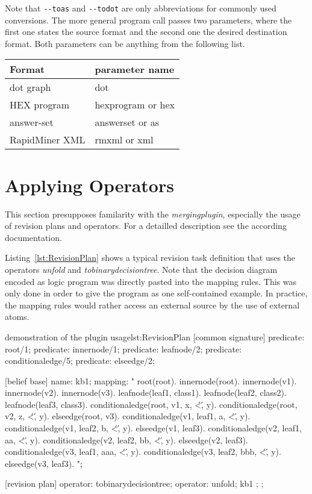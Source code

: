 \documentclass[a4paper,11pt]{article}
\theoremstyle{definition}
\newcommand{\hex}{\textsf{HEX}\xspace }
\newcommand{\dotff}{\textsf{dot}\xspace }
\newcommand{\inlinecode}[1]{\textsf{#1}\xspace }
\begin{document}
			Note that \verb+--toas+ and \verb+--todot+ are only abbreviations for commonly used conversions. The more general program call passes two parameters, where the first one
			states the source format and the second one the desired destination format. Both parameters can be anything from the following list.
			\begin{tabularx}{\textwidth}{|X|X|}
				\hline
				Format		& parameter name \\
				\hline
				\dotff graph & \inlinecode{dot} \\
				\hex program & \inlinecode{hexprogram} or \inlinecode{hex} \\
				answer-set & \inlinecode{answerset} or \inlinecode{as} \\
				RapidMiner XML & \inlinecode{rmxml} or \inlinecode{xml} \\
				\hline
			\end{tabularx}
			

	\section{Applying Operators}
	\label{sec:Operators}
	
		This section presupposes familarity with the \textit{mergingplugin}, especially the usage of revision plans and operators. For a detailled description see the according
		documentation.
		
		Listing~\ref{lst:RevisionPlan} shows a typical revision task definition that uses the operators \emph{unfold} and \emph{tobinarydecisiontree}. Note that the decision diagram
		encoded as logic program was directly pasted into the mapping rules. This was only done in order to give the program as one self-contained example. In practice, the mapping
		rules would rather access an external source by the use of external atoms.
		
		\begin{program}[dlvhex]{demonstration of the plugin usage}{lst:RevisionPlan}
[common signature]
predicate: root/1;
predicate: innernode/1;
predicate: leafnode/2;
predicate: conditionaledge/5;
predicate: elseedge/2;

[belief base]
name: kb1;
mapping: "
	root(root).
	innernode(root).
	innernode(v1).
	innernode(v2).
	innernode(v3).
	leafnode(leaf1, class1).
	leafnode(leaf2, class2).
	leafnode(leaf3, class3).
	conditionaledge(root, v1, x, \'<\', y).
	conditionaledge(root, v2, z, \'<\', y).
	elseedge(root, v3).
	conditionaledge(v1, leaf1, a, \'<\', y).
	conditionaledge(v1, leaf2, b, \'<\', y).
	elseedge(v1, leaf3).
	conditionaledge(v2, leaf1, aa, \'<\', y).
	conditionaledge(v2, leaf2, bb, \'<\', y).
	elseedge(v2, leaf3).
	conditionaledge(v3, leaf1, aaa, \'<\', y).
	conditionaledge(v3, leaf2, bbb, \'<\', y).
	elseedge(v3, leaf3).
";

[revision plan]
{
	operator: tobinarydecisiontree;
	{
		operator: unfold;
		{
			kb1
		};
	};
}
		\end{program}
		
\end{document}
